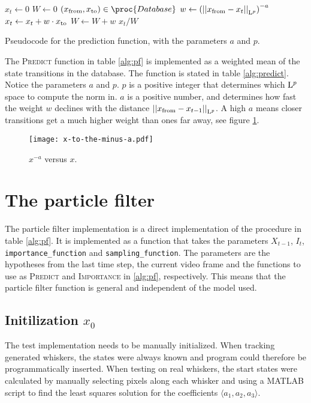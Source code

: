 \begin{table}[h]
  \begin{codebox}
    \li $ x_t \gets 0$
    \li $ W \gets 0$
    \li \ForEach $(\tf, \tt) \in \proc{Database}$
    \li \Do
      \li $ w \gets \left(\Lpnorm[p]{\tf - x_t}\right)^{-a}$
      \li $ x_t \gets x_t + w \cdot \tt$
      \li $ W \gets W + w$
    \End
    \li \Return $x_t / W$
  \end{codebox}
  \caption{Pseudocode for the prediction function, with the parameters $a$ and $p$.}
  \label{alg:predict}
\end{table}

The \textsc{Predict} function in table \ref{alg:pf} is implemented as a weighted mean of the
state transitions in the database. The function is stated in table
\ref{alg:predict}. Notice the parameters $a$ and $p$. $p$ is a
positive integer that determines which $\Lp$ space to compute the norm
in. $a$ is a positive number, and determines how fast the weight $w$
declines with the distance $\Lpnorm[p]{\tf - x_{t-1}}$. A high $a$
means closer transitions get a much higher weight than ones far away,
see figure \ref{fig:x-to-the-minus-a}.

\begin{figure}
  \centering
  \texttt{[image: x-to-the-minus-a.pdf]}
  \caption{$x^{-a}$ versus $x$.}
  \label{fig:x-to-the-minus-a}
\end{figure}




\section{The particle filter}

The particle filter implementation is a direct implementation of the
procedure in table \ref{alg:pf}. It is implemented as a function that
takes the parameters $X_{t-1}$, $I_t$, \texttt{importance\_function} and
\texttt{sampling\_function}. The parameters are the hypotheses from
the last time step, the current video frame and the functions to use
as \textsc{Predict} and \textsc{Importance} in \ref{alg:pf},
respectively. This means that the particle filter function is general
and independent of the model used.

\subsection{Initilization $x_0$}
The test implementation needs to be manually initialized. When
tracking generated whiskers, the states were always known and program
could therefore be programmatically inserted. When testing on real
whiskers, the start states were calculated by manually
selecting pixels along each whisker and using a MATLAB script to find
the least squares solution for the coefficients $\langle a_1, a_2, a_3 \rangle$.

